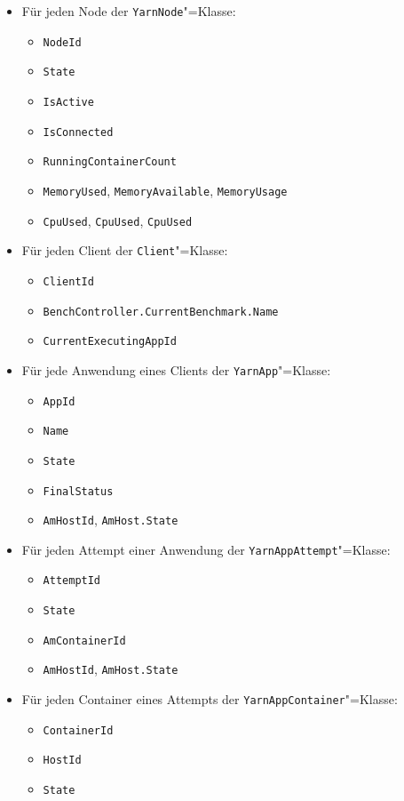 \begin{itemize}
    \item Für jeden Node der \texttt{YarnNode}"=Klasse:
    \begin{itemize}
        \item \texttt{NodeId}
        \item \texttt{State}
        \item \texttt{IsActive}
        \item \texttt{IsConnected}
        \item \texttt{RunningContainerCount}
        \item \texttt{MemoryUsed}, \texttt{MemoryAvailable}, \texttt{MemoryUsage}
        \item \texttt{CpuUsed}, \texttt{CpuUsed}, \texttt{CpuUsed}
    \end{itemize}

    \item Für jeden Client der \texttt{Client}"=Klasse:
    \begin{itemize}
        \item \texttt{ClientId}
        \item \texttt{BenchController.CurrentBenchmark.Name}
        \item \texttt{CurrentExecutingAppId}
    \end{itemize}
        \item Für jede Anwendung eines Clients der \texttt{YarnApp}"=Klasse:
        \begin{itemize}
            \item \texttt{AppId}
            \item \texttt{Name}
            \item \texttt{State}
            \item \texttt{FinalStatus}
            \item \texttt{AmHostId}, \texttt{AmHost.State}
        \end{itemize}
            \item Für jeden Attempt einer Anwendung der \texttt{YarnAppAttempt}"=Klasse:
            \begin{itemize}
                \item \texttt{AttemptId}
                \item \texttt{State}
                \item \texttt{AmContainerId}
                \item \texttt{AmHostId}, \texttt{AmHost.State}
            \end{itemize}
                \item Für jeden Container eines Attempts der \texttt{YarnAppContainer}"=Klasse:
                \begin{itemize}
                    \item \texttt{ContainerId}
                    \item \texttt{HostId}
                    \item \texttt{State}
                \end{itemize}
\end{itemize}

